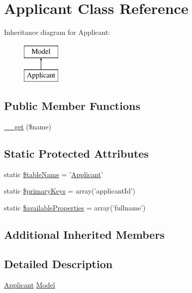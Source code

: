 \hypertarget{class_applicant}{\section{Applicant Class Reference}
\label{class_applicant}
}
Inheritance diagram for Applicant\-:\begin{figure}[H]
\begin{center}
\leavevmode
\includegraphics[height=2.000000cm]{class_applicant}
\end{center}
\end{figure}
\subsection*{Public Member Functions}
\begin{DoxyCompactItemize}
\item 
\hyperlink{class_applicant_a43a7086f2d32a8f96671db92b72029a4}{\-\_\-\-\_\-get} (\$name)
\end{DoxyCompactItemize}
\subsection*{Static Protected Attributes}
\begin{DoxyCompactItemize}
\item 
static \hyperlink{class_applicant_a9d77c56e6d97260988e8ffae590ccd9f}{\$table\-Name} = '\hyperlink{class_applicant}{Applicant}'
\item 
static \hyperlink{class_applicant_a0557a06061d1147f125169282c73c8d1}{\$primary\-Keys} = array('applicant\-Id')
\item 
static \hyperlink{class_applicant_ab7f7b5b72a33bef87ac8c297affec119}{\$available\-Properties} = array('fullname')
\end{DoxyCompactItemize}
\subsection*{Additional Inherited Members}


\subsection{Detailed Description}
\hyperlink{class_applicant}{Applicant} \hyperlink{class_model}{Model}

